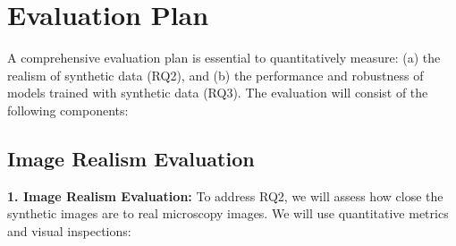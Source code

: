 \documentclass[
oneside,      %
openany       %
]{imc-inf}
\begin{document}
	
	
	
	\chapter{Evaluation Plan}\label{chap:evaluation}
	A comprehensive evaluation plan is essential to quantitatively measure: (a) the realism of synthetic data (RQ2), and (b) the performance and robustness of models trained with synthetic data (RQ3). The evaluation will consist of the following components:
	
	\section{Image Realism Evaluation}
	\textbf{1. Image Realism Evaluation:} To address RQ2, we will assess how close the synthetic images are to real microscopy images. We will use quantitative metrics and visual inspections:
	
\end{document}
